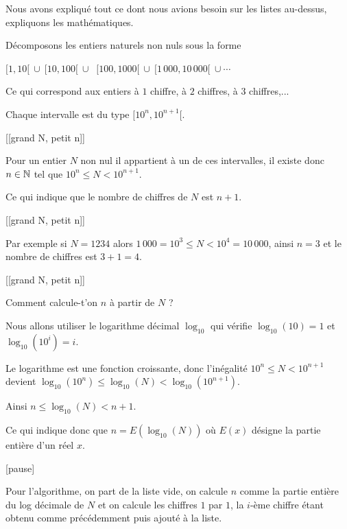 Nous avons expliqué tout ce dont nous avions besoin sur les listes au-dessus, 
expliquons les mathématiques.

\change

Décomposons les entiers naturels non nuls sous la forme 

  $[1,10[  \ \cup  \ [10,100[ \ \cup$
  $\  [100,1000[ \  \cup \  [1\,000,10\, 000[ \ \cup \cdots$ 

  Ce qui correspond aux entiers à $1$ chiffre, à $2$ chiffres, à $3$ chiffres,...
  
\change

  Chaque intervalle est du type $[10^n,10^{n+1}[$.
  
\change

[[grand N, petit n]]

  Pour un entier $N$ non nul il appartient à un de ces intervalles, il existe donc $n\in\mathbb{N}$ 
  tel que $10^n \le N < 10^{n+1}$. 
    
\change 

  Ce qui indique que le nombre de chiffres
  de $N$ est $n+1$.
  
\change 

[[grand N, petit n]]

  Par exemple si $N=1234$ alors $1 \, 000 = 10^3 \le N < 10^4 = 10\, 000$, 
  ainsi $n=3$ et le nombre de chiffres est $3+1=4$.
    
\change 

  [[grand N, petit n]]
  
Comment calcule-t'on $n$ à partir de $N$ ?

\change

Nous allons utiliser le logarithme décimal $\log_{10}$ qui vérifie
  $\log_{10}(10) = 1$ et $\log_{10}(10^i) = i$. 
  
  
\change

Le logarithme est une fonction croissante, donc l'inégalité 
  $10^n \le N < 10^{n+1}$ devient $\log_{10}(10^n) \le \log_{10}(N) < \log_{10}(10^{n+1})$. 
  
\change
  
  
  Ainsi $n \le \log_{10}(N) < n+1$.
  
  Ce qui indique donc que $n = E(\log_{10}(N))$ où $E(x)$ désigne la partie entière d'un réel $x$.
  
  [pause]
  
Pour l'algorithme, on part de la liste vide, 
on calcule $n$ comme la partie entière du log décimale de $N$
et on calcule les chiffres $1$ par $1$,
la $i$-ème chiffre étant obtenu comme précédemment
puis ajouté à la liste.


